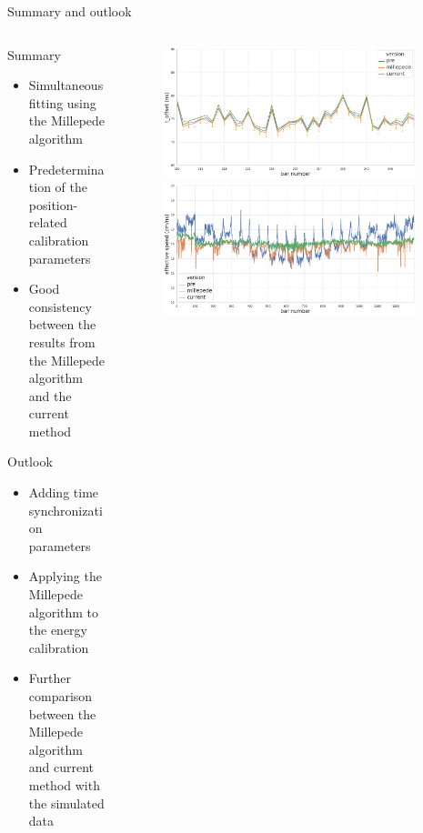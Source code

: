 \documentclass{ikpKoeln}
\begin{document}
\begin{frame}{Summary and outlook}
	\footnotesize
	\begin{columns}
		\begin{column}{0.49\textwidth}
			\begin{block}{Summary}
				\begin{itemize}
					\item Simultaneous fitting using the Millepede algorithm
					\item Predetermination of the position-related calibration parameters
					\item Good consistency between the results from the Millepede algorithm and the current method
				\end{itemize}
			\end{block}
			\begin{exampleblock}{Outlook}
				\begin{itemize}
					\item Adding time synchronization parameters
					\item Applying the Millepede algorithm to the energy calibration
					\item Further comparison between the Millepede algorithm and current method with the simulated data
				\end{itemize}
			\end{exampleblock}
		\end{column}
		\begin{column}{0.49\textwidth}
			\begin{figure}[t]
				\includegraphics[width = 0.95\textwidth]{R3BCon2024GSI/toffset_comp.png}
				\includegraphics[width = 0.95\textwidth]{R3BCon2024GSI/effective_c_comp.png}
			\end{figure}
		\end{column}
	\end{columns}
\end{frame}
\end{document}
